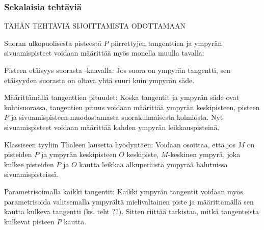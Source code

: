 \begin{tehtavasivu}
\begin{tehtava}
\begin{vastaus}
\begin{alakohdat}
\end{alakohdat}
\end{vastaus}
\end{tehtava}

\subsubsection*{Sekalaisia tehtäviä}


TÄHÄN TEHTÄVIÄ SIJOITTAMISTA ODOTTAMAAN

\begin{tehtava}
Suoran ulkopuolisesta pisteestä $P$ piirrettyjen tangenttien ja ympyrän sivuamispisteet voidaan määrittää myös monella muulla tavalla:

Pisteen etäisyys suorasta -kaavalla: Jos suora on ympyrän tangentti, sen etäisyyden suorasta on oltava yhtä suuri kuin ympyrän säde.

Määrittämällä tangenttien pituudet: Koska tangentit ja ympyrän säde ovat kohtisuorassa, tangentien pituus voidaan määrittää ympyrän keskipisteen, pisteen $P$ ja sivuamispisteen muodostamasta suorakulmaisesta kolmiosta. Nyt sivuamispisteet voidaan määrittää kahden ympyrän leikkauspisteinä.

Klassiseen tyyliin Thaleen lausetta hyödyntäen: Voidaan osoittaa, että jos $M$ on pisteiden $P$ ja ympyrän keskipisteen $O$ keskipiste, $M$-keskinen ympyrä, joka kulkee pisteiden $P$ ja $O$ kautta leikkaa alkuperäistä ympyrää halutuissa sivuamispisteissä.

Parametrisoimalla kaikki tangentit: Kaikki ympyrän tangentit voidaan myös parametrisoida valitsemalla ympyrältä mielivaltainen piste ja määrittämällä sen kautta kulkeva tangentti (ks. teht ??). Sitten riittää tarkistaa, mitkä tangenteista kulkevat pisteen $P$ kautta.

\begin{alakohdat}
\end{alakohdat}
\begin{vastaus}
\begin{alakohdat}
\end{alakohdat}
\end{vastaus}
\end{tehtava}


\end{tehtavasivu}
